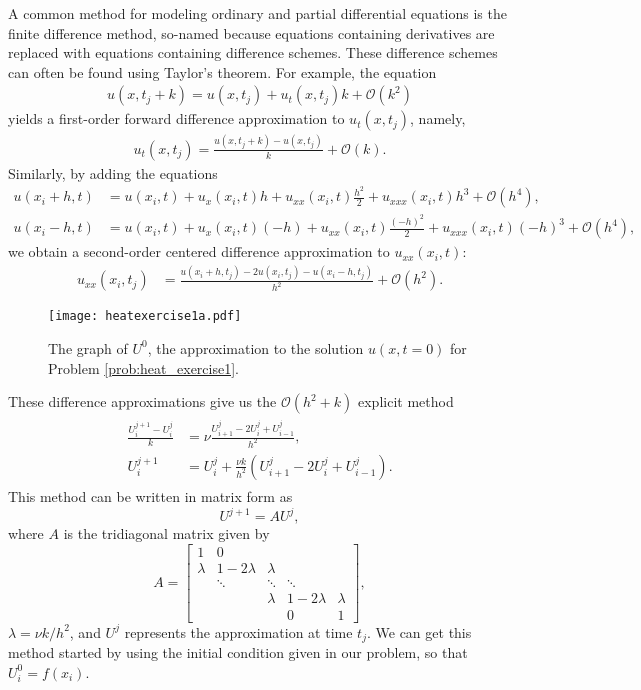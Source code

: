 A common method for modeling ordinary and partial differential equations is the finite difference method, so-named because equations containing derivatives are replaced with equations containing difference schemes.
These difference schemes can often be found using Taylor's theorem.
For example, the equation
\begin{align*}
	u(x,t_j + k) = u(x,t_j) + u_t(x,t_j)k + \mathcal{O}(k^2)
\end{align*}
yields a first-order forward difference approximation to $u_t(x,t_j)$, namely,
\begin{align*}
	u_t(x,t_j ) = \frac{u(x,t_j+k) - u(x,t_j)}{k} + \mathcal{O}(k).
\end{align*}
Similarly, by adding the equations
\begin{align*}
	u(x_i+h,t) &= u(x_i,t) + u_x(x_i,t)h + u_{xx}(x_i,t)\frac{h^2}{2} + u_{xxx}(x_i,t)h^3 + \mathcal{O}(h^4),\\
	u(x_i-h,t) &= u(x_i,t) + u_x(x_i,t)(-h) + u_{xx}(x_i,t)\frac{(-h)^2}{2} + u_{xxx}(x_i,t)(-h)^3 + \mathcal{O}(h^4),
\end{align*}
we obtain a second-order centered difference approximation to $u_{xx}(x_i,t)$:
\begin{align*}
	u_{xx}(x_i,t_j) &= \frac{u(x_i + h,t_j )-2 u(x_i,t_j)- u(x_i - h,t_j)}{h^2} + \mathcal{O}(h^2).
\end{align*}

\begin{figure}
\centering
\texttt{[image: heatexercise1a.pdf]}
\caption{The graph of $U^{0}$, the approximation to the solution $u(x,t=0)$ for Problem \ref{prob:heat_exercise1}.}
\label{fig:heatexercise1a}
\end{figure}

These difference approximations give us the $\mathcal{O}(h^2 + k)$ explicit method
\begin{align}
	\begin{split}
	\frac{U_{i}^{j+1} - U_{i}^{j}}{k} &= \nu \frac{U_{i+1}^{j}- 2U_{i}^{j} + U_{i-1}^{j} }{h^2} ,\\
	U_{i}^{j+1} &= U_{i}^{j} + \frac{\nu k}{h^2} (U_{i+1}^{j}- 2U_{i}^{j} + U_{i-1}^{j} ).
	\end{split}\label{eqn:firstorder_explicit}
\end{align}
This method can be written in matrix form as
\[U^{j+1} = A U^j,\]
where $A$ is the tridiagonal matrix given by
\[A = \left[\begin{array}{cccccc}1 & 0 & & & \\ \lambda & 1-2\lambda & \lambda & & \\ & \ddots & \ddots & \ddots & \\ & & \lambda & 1-2\lambda & \lambda \\  &  &  & 0 & 1\end{array}\right],\]
$\lambda = \nu k/h^2$, and $U^j$ represents the approximation at time $t_j$.
We can get this method started by using the initial condition given in our problem, so that $U_{i}^{0} = f(x_i)$.

